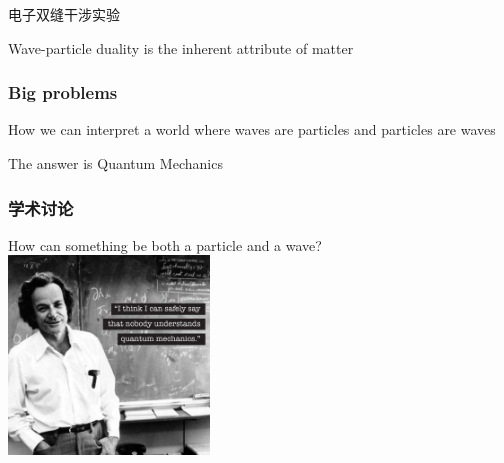 \begin{frame}{电子双缝干涉实验}
\end{frame}

\begin{frame}  
    \begin{tcolorbox}[colback=yellow!10,colframe=red!75!black,title=Conclusion]
    Wave-particle duality is the inherent attribute of matter
    \end{tcolorbox} 
\end{frame}

\begin{frame}  
    \frametitle{Big problems} 
  \begin{center}
    How we can interpret a world where waves are particles and particles are waves
  \end{center} 
\end{frame}

\begin{frame}  
  \begin{center}
    The answer is \alert{Quantum Mechanics}
  \end{center} 
\end{frame}

\begin{frame}   
    \frametitle{学术讨论}
    \begin{center} 
    {\color{red} \Large How can something be both a particle and a wave?}\\
    \includegraphics[width=0.4\textwidth]{figs/noone.jpg}
  \end{center} 
\end{frame}
